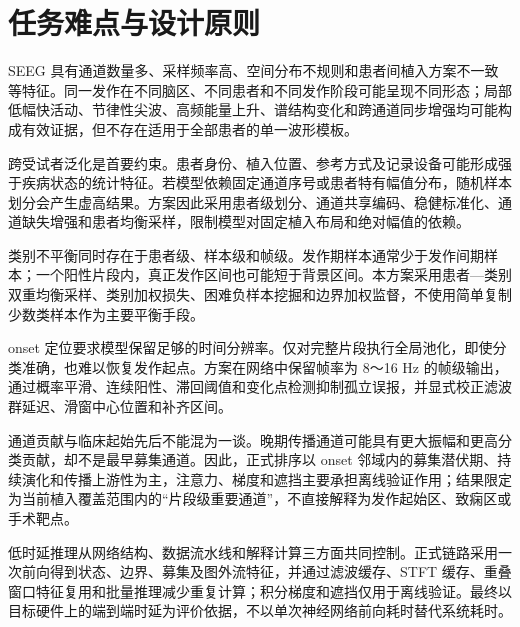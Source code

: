 \documentclass{cumcmthesis}
\numberwithin{figure}{section} %
\numberwithin{table}{section} %
\begin{document}


\clearpage

\section{任务难点与设计原则}

SEEG 具有通道数量多、采样频率高、空间分布不规则和患者间植入方案不一致等特征。同一发作在不同脑区、不同患者和不同发作阶段可能呈现不同形态；局部低幅快活动、节律性尖波、高频能量上升、谱结构变化和跨通道同步增强均可能构成有效证据，但不存在适用于全部患者的单一波形模板。

跨受试者泛化是首要约束。患者身份、植入位置、参考方式及记录设备可能形成强于疾病状态的统计特征。若模型依赖固定通道序号或患者特有幅值分布，随机样本划分会产生虚高结果。方案因此采用患者级划分、通道共享编码、稳健标准化、通道缺失增强和患者均衡采样，限制模型对固定植入布局和绝对幅值的依赖。

类别不平衡同时存在于患者级、样本级和帧级。发作期样本通常少于发作间期样本；一个阳性片段内，真正发作区间也可能短于背景区间。本方案采用患者—类别双重均衡采样、类别加权损失、困难负样本挖掘和边界加权监督，不使用简单复制少数类样本作为主要平衡手段。

onset 定位要求模型保留足够的时间分辨率。仅对完整片段执行全局池化，即使分类准确，也难以恢复发作起点。方案在网络中保留帧率为 8～16 Hz 的帧级输出，通过概率平滑、连续阳性、滞回阈值和变化点检测抑制孤立误报，并显式校正滤波群延迟、滑窗中心位置和补齐区间。

通道贡献与临床起始先后不能混为一谈。晚期传播通道可能具有更大振幅和更高分类贡献，却不是最早募集通道。因此，正式排序以 onset 邻域内的募集潜伏期、持续演化和传播上游性为主，注意力、梯度和遮挡主要承担离线验证作用；结果限定为当前植入覆盖范围内的“片段级重要通道”，不直接解释为发作起始区、致痫区或手术靶点。

低时延推理从网络结构、数据流水线和解释计算三方面共同控制。正式链路采用一次前向得到状态、边界、募集及图外流特征，并通过滤波缓存、STFT 缓存、重叠窗口特征复用和批量推理减少重复计算；积分梯度和遮挡仅用于离线验证。最终以目标硬件上的端到端时延为评价依据，不以单次神经网络前向耗时替代系统耗时。
\end{document}
